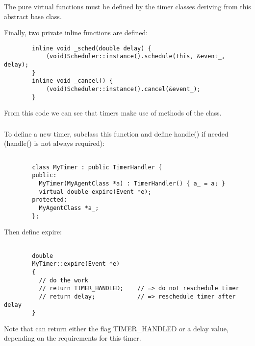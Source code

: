 The pure virtual functions must be defined by the timer classes deriving
from this abstract base class.

Finally, two private inline functions are defined:
\begin{small}
\begin{verbatim}
        inline void _sched(double delay) {
            (void)Scheduler::instance().schedule(this, &event_, delay);
        }
        inline void _cancel() {
            (void)Scheduler::instance().cancel(&event_);
        }
\end{verbatim}
\end{small}

From this code we can see that timers make use of methods of the 
 class.

\subsubsection{}

To define a new timer, subclass this function and define handle() if needed 
(handle() is not always required):

\begin{small}
\begin{verbatim}

        class MyTimer : public TimerHandler {
        public:
          MyTimer(MyAgentClass *a) : TimerHandler() { a_ = a; }
          virtual double expire(Event *e);
        protected:
          MyAgentClass *a_;
        };

\end{verbatim}
\end{small}

Then define expire:

\begin{small}
\begin{verbatim}

        double
        MyTimer::expire(Event *e)
        {
          // do the work
          // return TIMER_HANDLED;    // => do not reschedule timer
          // return delay;            // => reschedule timer after delay
        }

\end{verbatim}
\end{small}

Note that  can return either the flag TIMER\_HANDLED or a
delay value, depending on the requirements for this timer.

